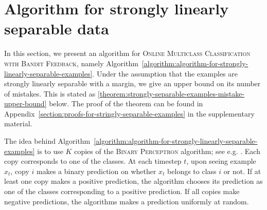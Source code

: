 \section{Algorithm for strongly linearly separable data}
\label{section:algorithm-for-strongly-linearly-separable-data}

In this section, we present an algorithm for \textsc{Online Multiclass
Classification with Bandit Feedback}, namely
Algorithm~\ref{algorithm:algorithm-for-strongly-linearly-separable-examples}.
Under the assumption that the examples are strongly linearly separable with a
margin, we give an upper bound on its number of mistakes. This is stated as
\autoref{theorem:strongly-separable-examples-mistake-upper-bound} below. The
proof of the theorem can be found in
Appendix~\ref{section:proofs-for-stringly-separable-examples} in the
supplementary material.

The idea behind
Algorithm~\ref{algorithm:algorithm-for-strongly-linearly-separable-examples} is
to use $K$ copies of the \textsc{Binary Perceptron} algorithm; see e.g.
\citet[Section 3.3.1]{Shalev-Shwartz-2012}. Each copy corresponds to one of the
classes. At each timestep $t$, upon seeing example $x_t$, copy $i$ makes a
binary prediction on whether $x_t$ belongs to class $i$ or not. If at least one
copy makes a positive prediction, the algorithm chooses its prediction as one of
the classes corresponding to a positive prediction. If all copies make negative
predictions, the algorithms makes a prediction uniformly at random.

